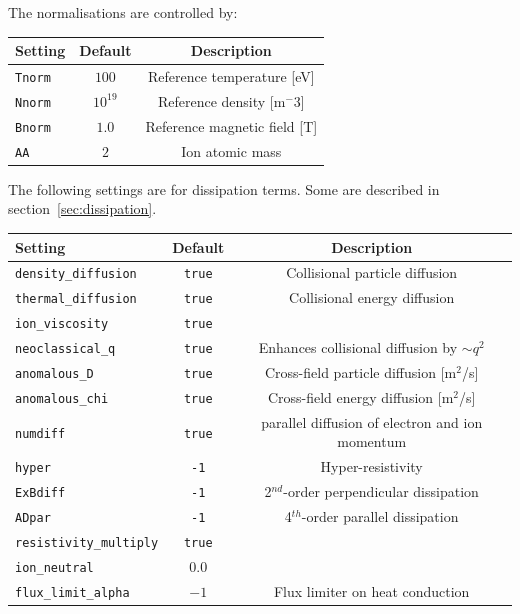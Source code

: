 \documentclass[12pt,a4paper]{article}
\begin{document}
The normalisations are controlled by:
\begin{center}
\begin{tabular}{l c c}
  Setting & Default & Description \\
  \hline
  \texttt{Tnorm} & $100$ & Reference temperature [eV] \\
  \texttt{Nnorm} & $10^{19}$ & Reference density [m$^-3$] \\
  \texttt{Bnorm} & $1.0$ & Reference magnetic field [T] \\
  \texttt{AA} & $2$ & Ion atomic mass \\
  \hline
\end{tabular}
\end{center}

The following settings are for dissipation terms.
Some are described in section~\ref{sec:dissipation}.
\begin{center}
\begin{tabular}{l c c}
  Setting & Default & Description \\
  \hline
  \texttt{density\_diffusion} & \texttt{true} & Collisional particle diffusion \\
  \texttt{thermal\_diffusion} & \texttt{true} & Collisional energy diffusion \\
  \texttt{ion\_viscosity} & \texttt{true} &  \\
  \texttt{neoclassical\_q} & \texttt{true} & Enhances collisional diffusion by $\sim q^2$ \\
  \hline
  \texttt{anomalous\_D} & \texttt{true} & Cross-field particle diffusion [m$^2$/s] \\
  \texttt{anomalous\_chi} & \texttt{true} & Cross-field energy diffusion [m$^2$/s] \\
  \hline
  \texttt{numdiff} & \texttt{true} & parallel diffusion of electron and ion momentum \\
  \texttt{hyper} & \texttt{-1} & Hyper-resistivity \\
  \texttt{ExBdiff} & \texttt{-1} & 2$^{nd}$-order perpendicular dissipation \\
  \texttt{ADpar} & \texttt{-1} & 4$^{th}$-order parallel dissipation \\
  \hline
  \texttt{resistivity\_multiply} & \texttt{true} &  \\
  \texttt{ion\_neutral} & $0.0$ & \\
  \texttt{flux\_limit\_alpha} & $-1$ & Flux limiter on heat conduction\\
  \hline
\end{tabular}
\end{center}
\end{document}
